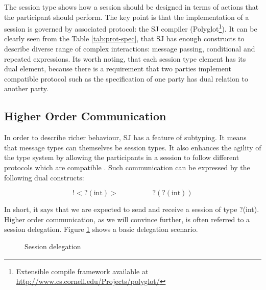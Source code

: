 \documentclass{llncs}
\begin{document}
The session type shows how a session should be designed in terms of actions that the participant should perform. The key point is that the implementation of a session is governed by associated protocol: the SJ compiler (Polyglot\footnote{Extensible compile framework available at \url{http://www.cs.cornell.edu/Projects/polyglot/}}). It can be clearly seen from the Table \ref{tab:prot-spec}, that SJ has enough constructs to describe diverse range of complex interactions: message passing, conditional and repeated expressions. Its worth noting, that each session type element has its dual element, because there is a requirement that two parties implement compatible protocol such as the specification of one party has dual relation to another party.

\subsection{Higher Order Communication}
In order to describe richer behaviour, SJ has a feature of subtyping. It means that message types can themselves be session types. It also enhances the agility of the type system by allowing the participants in a session to follow different protocols which are compatible \cite{higher-order-comm}. Such communication can be expressed by the following dual constructs:

\begin{equation*}
!<?(\text{int})> \hspace{2cm} ?(?(\text{int}))
\end{equation*}

In short, it says that we are expected to send and receive a session of type ?(int). Higher order communication, as we will convince further, is often referred to a session delegation. Figure \ref{fig:sj-delegation} shows a basic delegation scenario.

\begin{figure}[ht]
\centering
{}
\caption{Session delegation}\label{fig:sj-delegation}
\end{figure}
\end{document}
